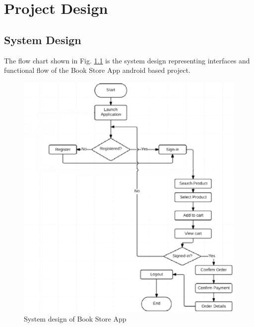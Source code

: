 \chapter{Project Design}
\section{System Design}
The flow chart shown in Fig. \ref{design} is the system design representing interfaces and functional flow of the Book Store App android based project.

\begin{figure}[h]\centering
	\includegraphics[width=4.8in]{design.png}
	\caption{System design of Book Store App}\label{design}
\end{figure}

